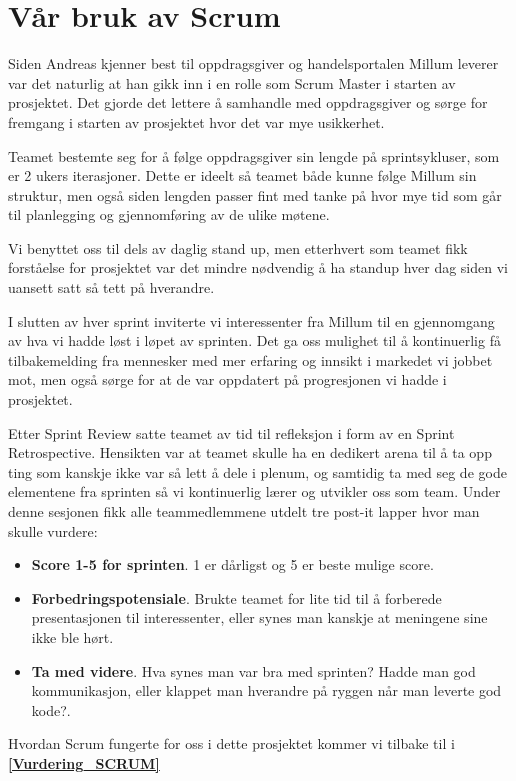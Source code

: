 \section{\textbf{Vår bruk av Scrum}}
Siden Andreas kjenner best til oppdragsgiver og handelsportalen Millum leverer var det naturlig at han gikk inn i en rolle som Scrum Master i starten av prosjektet. Det gjorde det lettere å samhandle med oppdragsgiver og sørge for fremgang i starten av prosjektet hvor det var mye usikkerhet. 

Teamet bestemte seg for å følge oppdragsgiver sin lengde på sprintsykluser, som er 2 ukers iterasjoner. Dette er ideelt så teamet både kunne følge Millum sin struktur, men også siden lengden passer fint med tanke på hvor mye tid som går til planlegging og gjennomføring av de ulike møtene.

Vi benyttet oss til dels av daglig stand up, men etterhvert som teamet fikk forståelse for prosjektet var det mindre nødvendig å ha standup hver dag siden vi uansett satt så tett på hverandre. 

I slutten av hver sprint inviterte vi interessenter fra Millum til en gjennomgang av hva vi hadde løst i løpet av sprinten. Det ga oss mulighet til å kontinuerlig få tilbakemelding fra mennesker med mer erfaring og innsikt i markedet vi jobbet mot, men også sørge for at de var oppdatert på progresjonen vi hadde i prosjektet.

Etter Sprint Review satte teamet av tid til refleksjon i form av en Sprint Retrospective. Hensikten var at teamet skulle ha en dedikert arena til å ta opp ting som kanskje ikke var så lett å dele i plenum, og samtidig ta med seg de gode elementene fra sprinten så vi kontinuerlig lærer og utvikler oss som team. Under denne sesjonen fikk alle teammedlemmene utdelt tre post-it lapper hvor man skulle vurdere:

\begin{itemize}
    \item \textbf{Score 1-5 for sprinten}. 1 er dårligst og 5 er beste mulige score.
    \item \textbf{Forbedringspotensiale}. Brukte teamet for lite tid til å forberede presentasjonen til interessenter, eller synes man kanskje at meningene sine ikke ble hørt.
    \item \textbf{Ta med videre}. Hva synes man var bra med sprinten? Hadde man god kommunikasjon, eller klappet man hverandre på ryggen når man leverte god kode?.
\end{itemize}

Hvordan Scrum fungerte for oss i dette prosjektet kommer vi tilbake til i \textbf{\ref{Vurdering_SCRUM}}












